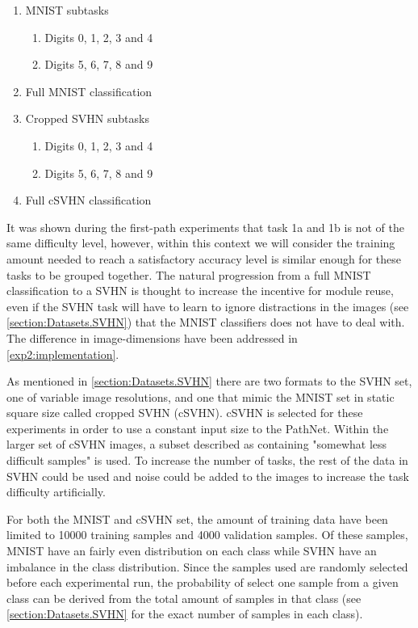 \begin{enumerate}
    \item MNIST subtasks
    \begin{enumerate}
        \item Digits 0, 1, 2, 3 and 4
        \item Digits 5, 6, 7, 8 and 9 
    \end{enumerate}
    \item Full MNIST classification
    \item Cropped SVHN subtasks
    \begin{enumerate}
        \item Digits 0, 1, 2, 3 and 4
        \item Digits 5, 6, 7, 8 and 9 
    \end{enumerate}
    \item Full cSVHN classification
\end{enumerate}

It was shown during the first-path experiments that task 1a and 1b is not of the same difficulty level, however, within this context we will consider the training amount needed to reach a satisfactory accuracy level is similar enough for these tasks to be grouped together. The natural progression from a full MNIST classification to a SVHN is thought to increase the incentive for module reuse, even if the SVHN task will have to learn to ignore distractions in the images (see \ref{section:Datasets.SVHN}) that the MNIST classifiers does not have to deal with. The difference in image-dimensions have been addressed in \ref{exp2:implementation}.

As mentioned in \ref{section:Datasets.SVHN} there are two formats to the SVHN set, one of variable image resolutions, and one that mimic the MNIST set in static square size called cropped SVHN (cSVHN). cSVHN is selected for these experiments in order to use a constant input size to the PathNet. Within the larger set of cSVHN images, a subset described as containing "somewhat less difficult samples" is used. To increase the number of tasks, the rest of the data in SVHN could be used and noise could be added to the images to increase the task difficulty artificially. 

For both the MNIST and cSVHN set, the amount of training data have been limited to 10000 training samples and 4000 validation samples. Of these samples, MNIST have an fairly even distribution on each class while SVHN have an imbalance in the class distribution. Since the samples used are randomly selected before each experimental run, the probability of select one sample from a given class can be derived from the total amount of samples in that class (see \ref{section:Datasets.SVHN} for the exact number of samples in each class).

